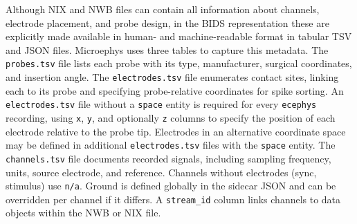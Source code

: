 \documentclass[fleqn,10pt]{article}
\newcommand{\rrid}[1]{\href{https://scicrunch.org/resolver/#1}{#1}}
\begin{document}
Although NIX and NWB files can contain all information about channels, electrode placement, and probe design, in the BIDS representation these are explicitly made available in human- and machine-readable format in tabular TSV and JSON files.
Microephys uses three tables to capture this metadata.
The \verb|probes.tsv| file lists each probe with its type, manufacturer, surgical coordinates, and insertion angle.
The \verb|electrodes.tsv| file enumerates contact sites, linking each to its probe and specifying probe-relative coordinates for spike sorting.
An \verb|electrodes.tsv| file without a \verb|space| entity is required for every \texttt{ecephys} recording, using \texttt{x}, \texttt{y}, and optionally \texttt{z} columns to specify the position of each electrode relative to the probe tip.
Electrodes in an alternative coordinate space may be defined in additional \verb|electrodes.tsv| files with the \verb|space| entity.
The \verb|channels.tsv| file documents recorded signals, including sampling frequency, units, source electrode, and reference.
Channels without electrodes (sync, stimulus) use \texttt{n/a}. Ground is defined globally in the sidecar JSON and can be overridden per channel if it differs.
A \verb|stream_id| column links channels to data objects within the NWB or NIX file.




\end{document}
